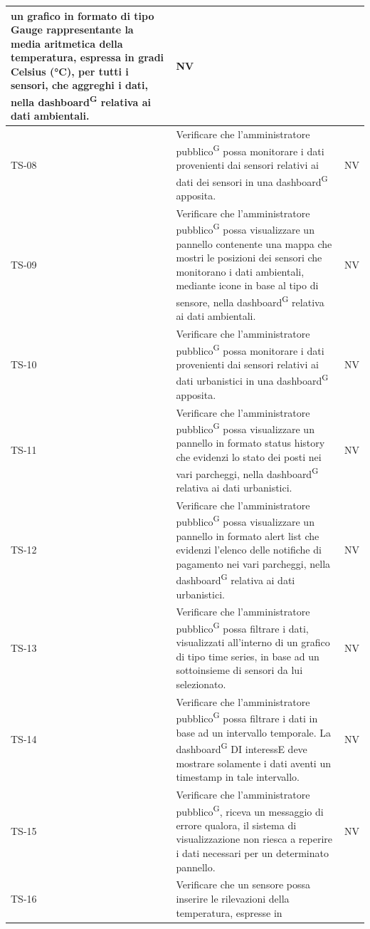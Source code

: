 \documentclass[8pt]{article}
\newcommand{\glossterm}[1]{#1\textsuperscript{G}} %
\begin{document}
\begin{longtable}{|>{\centering}p{2cm}|>{\RaggedRight}m{12cm}|>{\centering\arraybackslash}p{2cm}|}
    un grafico in formato di tipo Gauge rappresentante la media aritmetica della temperatura,
    espressa in gradi Celsius (°C), per tutti i sensori, che aggreghi i dati, nella \glossterm{dashboard} relativa ai dati ambientali.
    & NV \\
    \hline 
    TS-08 & Verificare che l’\glossterm{amministratore pubblico} possa  monitorare i dati
    provenienti dai sensori relativi ai dati dei sensori in una \glossterm{dashboard} apposita.
    & NV \\
    \hline
    TS-09 & Verificare che l’\glossterm{amministratore pubblico} possa visualizzare un pannello
    contenente una mappa che mostri le posizioni dei sensori che monitorano i dati ambientali,
    mediante icone in base al tipo di sensore, nella \glossterm{dashboard} relativa ai dati
    ambientali. & NV \\
    \hline
    TS-10 & Verificare che l’\glossterm{amministratore pubblico} possa monitorare i dati provenienti
    dai sensori relativi ai dati urbanistici in una \glossterm{dashboard} apposita.
    & NV \\
    \hline
    TS-11 & Verificare che l’\glossterm{amministratore pubblico} possa visualizzare un pannello in formato status history che evidenzi lo stato dei posti nei vari parcheggi, nella
    \glossterm{dashboard} relativa ai dati urbanistici. & NV \\
    \hline
    TS-12 & 
    Verificare che l’\glossterm{amministratore pubblico} possa visualizzare un pannello in formato
    alert list che evidenzi l'elenco delle notifiche di pagamento nei vari parcheggi, nella \glossterm{dashboard} relativa ai dati urbanistici.& NV \\
    \hline
    TS-13 & Verificare che l’\glossterm{amministratore pubblico} possa filtrare i dati, visualizzati
    all’interno di un grafico di tipo time series, in base ad un sottoinsieme di sensori da lui
    selezionato. & NV \\
    \hline
    TS-14 & Verificare che l’\glossterm{amministratore pubblico} possa filtrare i dati in base ad un intervallo temporale. La \glossterm{dashboard} DI interessE deve mostrare solamente i dati aventi un timestamp in tale intervallo.
    & NV\\
    \hline
    TS-15 & Verificare che l’\glossterm{amministratore pubblico}, riceva un messaggio di errore qualora, il
    sistema di visualizzazione non riesca a reperire i dati necessari per un determinato pannello. &
    NV \\
    \hline
    TS-16 & Verificare che un sensore possa inserire le rilevazioni della temperatura, espresse in

\end{longtable}
\end{document}
